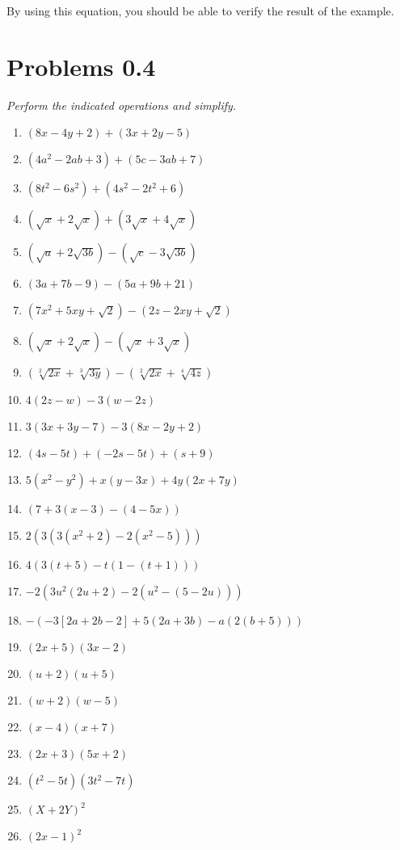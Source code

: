 \documentclass{article}
\begin{document}
\begin{onehalfspace}
By using this equation, you should be able to verify the result of the example.

\section{Problems 0.4}
\textit{Perform the indicated operations and simplify.}

\begin{enumerate}
    \item $(8x - 4y + 2) + (3x + 2y - 5)$
    \item $(4a^{2} - 2ab + 3) + (5c - 3ab + 7)$
    \item $(8t^{2} - 6s^{2}) + (4s^{2} - 2t^{2} + 6)$
    \item $(\sqrt{x} + 2\sqrt{x}) + (3\sqrt{x} + 4\sqrt{x})$
    \item $(\sqrt{a} + 2\sqrt{3b}) - (\sqrt{c} - 3\sqrt{3b})$
    \item $(3a + 7b - 9) - (5a + 9b + 21)$
    \item $(7x^{2} + 5xy + \sqrt{2}) - (2z - 2xy + \sqrt{2})$
    \item $(\sqrt{x} + 2\sqrt{x}) - (\sqrt{x} + 3\sqrt{x})$
    \item $(\sqrt[2]{2x} + \sqrt[3]{3y}) - (\sqrt[2]{2x} + \sqrt[4]{4z})$
    \item $4(2z - w) - 3(w - 2z)$
    \item $3(3x + 3y - 7) - 3(8x - 2y + 2)$
    \item $(4s - 5t) + (-2s - 5t) + (s + 9)$
    \item $5(x^{2} - y^{2}) + x(y - 3x) + 4y(2x + 7y)$
    \item $(7 + 3(x - 3) - (4 - 5x))$
    \item $2(3(3(x^{2} + 2) - 2(x^{2} - 5)))$
    \item $4(3(t + 5) - t(1 - (t + 1)))$
    \item $-2(3u^{2}(2u + 2) - 2(u^{2} - (5 - 2u)))$
    \item $-(-3[2a + 2b - 2] + 5(2a + 3b) - a(2(b + 5)))$
    \item $(2x + 5)(3x - 2)$
    \item $(u + 2)(u + 5)$
    \item $(w + 2)(w - 5)$
    \item $(x - 4)(x + 7)$
    \item $(2x + 3)(5x + 2)$
    \item $(t^{2} - 5t)(3t^{2} - 7t)$
    \item $(X + 2Y)^{2}$
    \item $(2x - 1)^{2}$

\end{enumerate}
\end{onehalfspace}
\end{document}
